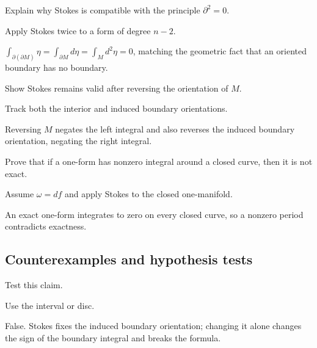 \begin{exercise}\label{exr:vii11-ped-07}
Explain why Stokes is compatible with the principle \(\partial^2=0\).
\end{exercise}
\begin{hint}
Apply Stokes twice to a form of degree \(n-2\).
\end{hint}
\begin{solution}
\(\int_{\partial(\partial M)}\eta=\int_{\partial M}d\eta=\int_Md^2\eta=0\), matching the geometric fact that an oriented boundary has no boundary.
\end{solution}

\begin{exercise}\label{exr:vii11-ped-08}
Show Stokes remains valid after reversing the orientation of \(M\).
\end{exercise}
\begin{hint}
Track both the interior and induced boundary orientations.
\end{hint}
\begin{solution}
Reversing \(M\) negates the left integral and also reverses the induced boundary orientation, negating the right integral.
\end{solution}

\begin{exercise}\label{exr:vii11-ped-09}
Prove that if a one-form has nonzero integral around a closed curve, then it is not exact.
\end{exercise}
\begin{hint}
Assume \(\omega=df\) and apply Stokes to the closed one-manifold.
\end{hint}
\begin{solution}
An exact one-form integrates to zero on every closed curve, so a nonzero period contradicts exactness.
\end{solution}

\subsection*{Counterexamples and hypothesis tests}

\begin{exercise}\label{exr:vii11-ped-10}
Test this claim.
\end{exercise}
\begin{hint}
Use the interval or disc.
\end{hint}
\begin{solution}
False.  Stokes fixes the induced boundary orientation; changing it alone changes the sign of the boundary integral and breaks the formula.
\end{solution}

